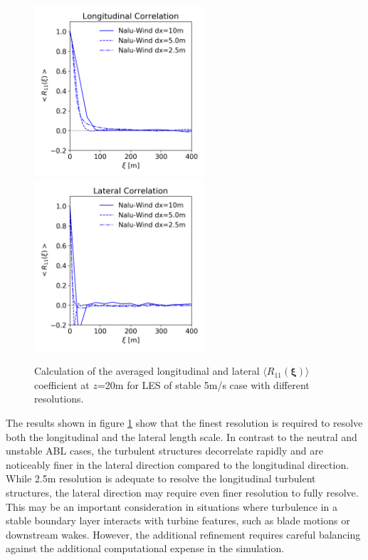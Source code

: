 \begin{figure}%
  \centering
  \includegraphics[width=2.5in]{figures/GridStudy_Rij_Longitudinal.png}
  \includegraphics[width=2.5in]{figures/GridStudy_Rij_Lateral.png}
  \caption{\label{fig:GridStudyRij} Calculation of the averaged
    longitudinal and lateral $\langle R_{11}(\boldsymbol{\xi})
    \rangle$ coefficient at $z$=20m for LES of stable 5m/s case with
    different resolutions.}
\end{figure}

The results shown in figure \ref{fig:GridStudyRij} show that the
finest resolution is required to resolve both the longitudinal and the
lateral length scale.  In contrast to the neutral and unstable ABL
cases, the turbulent structures decorrelate rapidly and are noticeably
finer in the lateral direction compared to the longitudinal direction.
While 2.5m resolution is adequate to resolve the longitudinal
turbulent structures, the lateral direction may require even finer
resolution to fully resolve.  This may be an important consideration
in situations where turbulence in a stable boundary layer interacts
with turbine features, such as blade motions or downstream wakes.
However, the additional refinement requires careful balancing against
the additional computational expense in the simulation.

